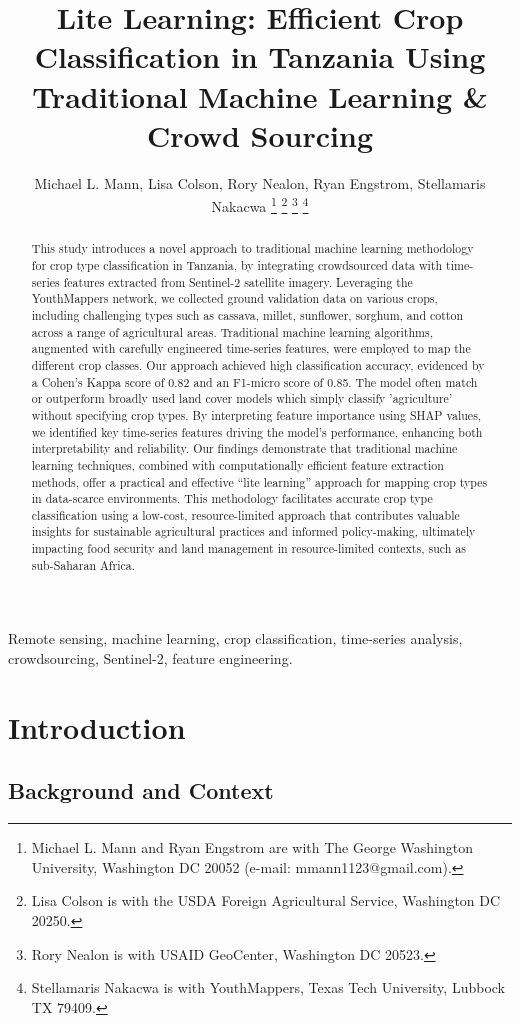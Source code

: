 \documentclass[journal]{IEEEtran}
\title{Lite Learning: Efficient Crop Classification in Tanzania Using Traditional Machine Learning \& Crowd Sourcing}
\author{
    Michael L. Mann, 
    Lisa Colson,
    Rory Nealon,
    Ryan Engstrom,
    Stellamaris Nakacwa
    \thanks{Michael L. Mann and Ryan Engstrom are with The George Washington University, Washington DC 20052 (e-mail: mmann1123@gmail.com).}
    \thanks{Lisa Colson is with the USDA Foreign Agricultural Service, Washington DC 20250.}
    \thanks{Rory Nealon is with USAID GeoCenter, Washington DC 20523.}
    \thanks{Stellamaris Nakacwa is with YouthMappers, Texas Tech University, Lubbock TX 79409.}
}
\begin{document}
\maketitle

\begin{abstract}
This study introduces a novel approach to traditional machine learning methodology for crop type classification in Tanzania, by integrating crowdsourced data with time-series features extracted from Sentinel-2 satellite imagery. Leveraging the YouthMappers network, we collected ground validation data on various crops, including challenging types such as cassava, millet, sunflower, sorghum, and cotton across a range of agricultural areas. Traditional machine learning algorithms, augmented with carefully engineered time-series features, were employed to map the different crop classes. Our approach achieved high classification accuracy, evidenced by a Cohen's Kappa score of 0.82 and an F1-micro score of 0.85. The model often match or outperform broadly used land cover models which simply classify 'agriculture' without specifying crop types. By interpreting feature importance using SHAP values, we identified key time-series features driving the model's performance, enhancing both interpretability and reliability. Our findings demonstrate that traditional machine learning techniques, combined with computationally efficient feature extraction methods, offer a practical and effective “lite learning” approach for mapping crop types in data-scarce environments. This methodology facilitates accurate crop type classification using a low-cost, resource-limited approach that contributes valuable insights for sustainable agricultural practices and informed policy-making, ultimately impacting food security and land management in resource-limited contexts, such as sub-Saharan Africa.
\end{abstract}

\begin{IEEEkeywords}
Remote sensing, machine learning, crop classification, time-series analysis, crowdsourcing, Sentinel-2, feature engineering.
\end{IEEEkeywords}

\section{Introduction}
\subsection{Background and Context}
\end{document}
